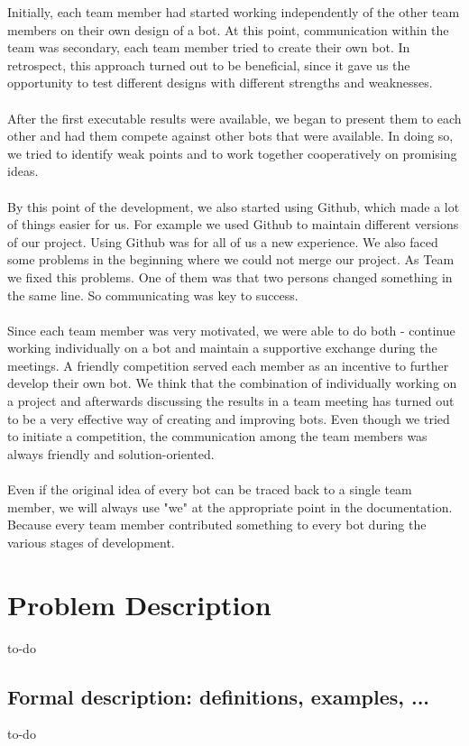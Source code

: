 \documentclass[a4paper,12pt]{article}
\begin{document}
Initially, each team member had started working independently of the other team members on their
own design of a bot. At this point, communication within the team was secondary, each team
member tried to create their own bot. In retrospect, this approach turned out to be beneficial, since it
gave us the opportunity to test different designs with different strengths and weaknesses.\\
\\After the first executable results were available, we began to present them to each other and had
them compete against other bots that were available. In doing so, we tried to identify weak points
and to work together cooperatively on promising ideas.\\
\\By this point of the development, we also started using Github, which made a lot of things easier for
us. For example we used Github to maintain different versions of our project. Using Github was for all of us a new experience. We also faced some problems in the beginning where we could not merge our project. As Team we fixed this problems. One of them was that two persons changed something in the same line. So communicating was key to success.\\
\\Since each team member was very motivated, we were able to do both - continue working
individually on a bot and maintain a supportive exchange during the meetings. A friendly
competition served each member as an incentive to further develop their own bot. We think that the
combination of individually working on a project and afterwards discussing the results in a team
meeting has turned out to be a very effective way of creating and improving bots. Even though we
tried to initiate a competition, the communication among the team members was always friendly
and solution-oriented.\\
\\Even if the original idea of every bot can be traced back to a single team member, we will always
use "we" at the appropriate point in the documentation. Because every team member contributed
something to every bot during the various stages of development.
\newpage	

\section{Problem Description}
to-do
\subsection{Formal description: definitions, examples, ...}
to-do
\end{document}
